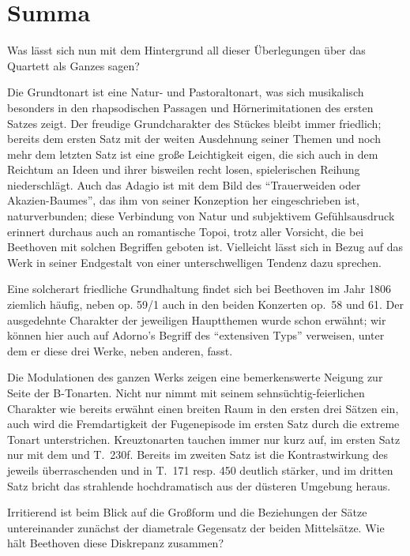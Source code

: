 \section{Summa}

Was lässt sich nun mit dem Hintergrund all dieser Überlegungen über das
Quartett als Ganzes sagen?

Die Grundtonart  ist eine Natur- und Pastoraltonart,
was sich musikalisch besonders in den rhapsodischen Passagen
und Hörnerimitationen des ersten Satzes zeigt.  Der
freudige Grundcharakter des Stückes bleibt immer friedlich; bereits dem
ersten Satz mit der weiten Ausdehnung seiner Themen und noch mehr dem
letzten Satz ist eine große Leichtigkeit eigen, die sich auch in dem
Reichtum an Ideen und ihrer bisweilen recht losen, spielerischen Reihung
niederschlägt.  Auch das Adagio ist mit dem Bild des \enquote{Trauerweiden
oder Akazien-Baumes}, das ihm von seiner Konzeption her eingeschrieben ist, 
naturverbunden; diese Verbindung von Natur und subjektivem Gefühlsausdruck
erinnert durchaus auch an romantische Topoi, trotz aller Vorsicht, die
bei Beethoven mit solchen Begriffen geboten ist.  Vielleicht lässt sich
in Bezug auf das Werk in seiner Endgestalt von einer unterschwelligen
Tendenz dazu sprechen.

Eine solcherart friedliche Grundhaltung findet sich bei Beethoven im Jahr
1806 ziemlich häufig, neben op. 59/1 auch in den beiden Konzerten op.~58
und 61.  Der ausgedehnte Charakter der jeweiligen Hauptthemen wurde schon
erwähnt; wir können hier auch auf Adorno’s Begriff des \enquote{extensiven
Typs} verweisen, unter dem er diese drei Werke, neben anderen,
fasst\cite[Nr.~216 \& 219]{adorno}.

Die Modulationen des ganzen Werks zeigen eine bemerkenswerte Neigung
zur Seite der B-Tonarten.  Nicht nur nimmt  mit seinem
sehnsüchtig-feierlichen Charakter wie bereits erwähnt einen breiten
Raum in den ersten drei Sätzen ein, auch wird die Fremdartigkeit der
Fugenepisode im ersten Satz durch die extreme Tonart 
unterstrichen.  Kreuztonarten tauchen immer nur kurz auf, im ersten
Satz nur mit dem  und  T.~230f.  Bereits
im zweiten Satz ist die Kontrastwirkung des jeweils überraschenden
 und  in T.~171 resp. 450 deutlich
stärker, und im dritten Satz bricht das strahlende 
hochdramatisch aus der düsteren Umgebung heraus.

Irritierend ist beim Blick auf die Großform und die Beziehungen der
Sätze untereinander zunächst der diametrale Gegensatz der beiden
Mittelsätze.  Wie hält Beethoven diese Diskrepanz zusammen?

